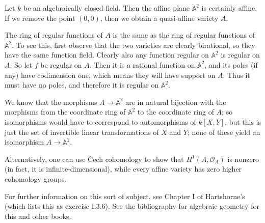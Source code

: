 \documentclass[12pt]{article}
\begin{document}
Let $k$ be an algebraically closed field.  Then the affine plane $\mathbb{A}^2$ is certainly affine.  If we remove the point $(0,0)$, then we obtain a quasi-affine variety $A$.  

The ring of regular functions of $A$ is the same as the ring of regular functions of $\mathbb{A}^2$.  To see this, first observe that the two varieties are clearly birational, so they have the same function field.  Clearly also any function regular on $\mathbb{A}^2$ is regular on $A$.  So let $f$ be regular on $A$.  Then it is a rational function on $\mathbb{A}^2$, and its poles (if any) have codimension one, which means they will have support on $A$.  Thus it must have no poles, and therefore it is regular on $\mathbb{A}^2$. 

We know that the morphisms $A\to\mathbb{A}^2$ are in natural bijection with the morphisms from the coordinate ring of $\mathbb{A}^2$ to the coordinate ring of $A$; so isomorphisms would have to correspond to automorphisms of $k[X,Y]$, but this is just the set of invertible linear transformations of $X$ and $Y$; none of these yield an isomorphism $A\to\mathbb{A}^2$.  

Alternatively, one can use \v{C}ech cohomology to show that $H^1(A,\mathcal{O}_A)$ is nonzero (in fact, it is infinite-dimensional), while every affine variety has zero higher cohomology groups.

For further information on this sort of subject, see Chapter I of Hartshorne's  (which lists this as exercise I.3.6).  See the bibliography for algebraic geometry for this and other books.
\end{document}
